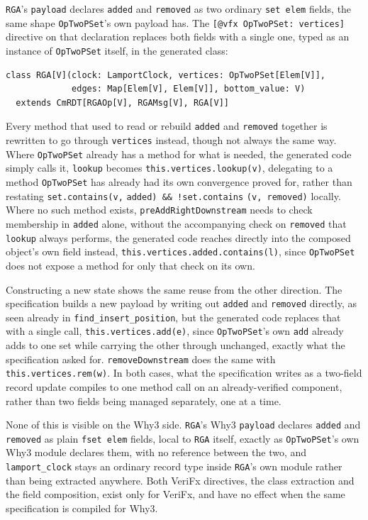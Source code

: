 \texttt{RGA}'s \texttt{payload} declares \texttt{added} and \texttt{removed} as two ordinary \texttt{set elem} fields,
the same shape \texttt{OpTwoPSet}'s own payload has. The \texttt{[@vfx OpTwoPSet: vertices]} directive on that
declaration replaces both fields with a single one, typed as an instance of \texttt{OpTwoPSet} itself, in the generated
class:

\begin{verbatim}
class RGA[V](clock: LamportClock, vertices: OpTwoPSet[Elem[V]],
             edges: Map[Elem[V], Elem[V]], bottom_value: V)
  extends CmRDT[RGAOp[V], RGAMsg[V], RGA[V]]
\end{verbatim}

Every method that used to read or rebuild \texttt{added} and \texttt{removed} together is rewritten to go through
\texttt{vertices} instead, though not always the same way. Where \texttt{OpTwoPSet} already has a method for what is
needed, the generated code simply calls it, \texttt{lookup} becomes \texttt{this.vertices.lookup(v)}, delegating to a
method \texttt{OpTwoPSet} has already had its own convergence proved for, rather than restating
\texttt{set.contains(v,} \texttt{added) \&\& !set.contains} \texttt{(v, removed)} locally. Where no such method exists,
\texttt{preAddRightDownstream} needs to check membership in \texttt{added} alone, without the accompanying check on
\texttt{removed} that \texttt{lookup} always performs, the generated code reaches directly into the composed object's
own field instead, \texttt{this.vertices.added.contains(l)}, since \texttt{OpTwoPSet} does not expose a method for only
that check on its own.

Constructing a new state shows the same reuse from the other direction. The specification builds a new payload by
writing out \texttt{added} and \texttt{removed} directly, as seen already in \texttt{find\_insert\_position}, but the
generated code replaces that with a single call, \texttt{this.vertices.add(e)}, since \texttt{OpTwoPSet}'s own
\texttt{add} already adds to one set while carrying the other through unchanged, exactly what the specification asked
for. \texttt{removeDownstream} does the same with \texttt{this.vertices.rem(w)}. In both cases, what the specification
writes as a two-field record update compiles to one method call on an already-verified component, rather than two fields
being managed separately, one at a time.

None of this is visible on the Why3 side. \texttt{RGA}'s Why3 \texttt{payload} declares \texttt{added} and
\texttt{removed} as plain \texttt{fset elem} fields, local to \texttt{RGA} itself, exactly as \texttt{OpTwoPSet}'s own
Why3 module declares them, with no reference between the two, and \texttt{lamport\_clock} stays an ordinary record type
inside \texttt{RGA}'s own module rather than being extracted anywhere. Both VeriFx directives, the class extraction and
the field composition, exist only for VeriFx, and have no effect when the same specification is compiled for Why3.
